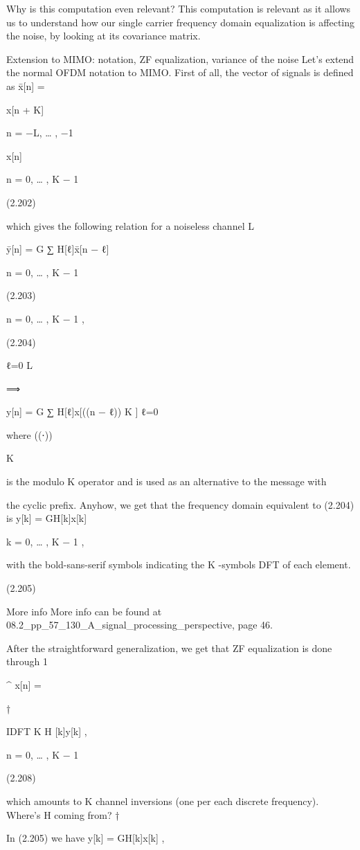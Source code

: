 {{​Why is this computation even relevant?
This computation is relevant as it allows us to understand how our single carrier frequency domain equalization is affecting the noise, by looking at its covariance matrix.

Extension to MIMO: notation, ZF equalization, variance of the noise Let's extend the normal OFDM notation to MIMO.
First of all, the vector of signals is defined as x̄[n] = {

x[n + K]

n = −L, … , −1

x[n]

n = 0, … , K − 1

(2.202)

which gives the following relation for a noiseless channel L

ȳ[n] = \sqrt G ∑ H[ℓ]x̄[n − ℓ]

n = 0, … , K − 1

(2.203)

n = 0, … , K − 1 ,

(2.204)

ℓ=0 L

⟹

y[n] = \sqrt G ∑ H[ℓ]x[((n − ℓ)) K ]
ℓ=0

where ((⋅))

K

is the modulo K operator and is used as an alternative to the message with

the cyclic prefix.
Anyhow, we get that the frequency domain equivalent to (2.204) is y[k] = \sqrt GH[k]x[k]

k = 0, … , K − 1 ,

with the bold-sans-serif symbols indicating the K -symbols DFT of each element.

(2.205)

More info More info can be found at 08.2_pp_57_130_A_signal_processing_perspective, page 46.

After the straightforward generalization, we get that ZF equalization is done through 1

^
x[n]
=

†

IDFT K {H [k]y[k]} ,

n = 0, … , K − 1

(2.208)

\sqrtG

which amounts to K channel inversions (one per each discrete frequency).
​Where's H coming from?
†

In (2.205) we have y[k] = \sqrt GH[k]x[k] ,

}}}
